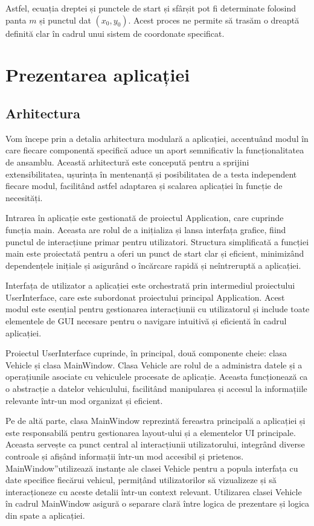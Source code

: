\documentclass[a4paper,12pt]{report}
\begin{document}
Astfel, ecuația dreptei și punctele de start și sfârșit pot fi determinate folosind panta $m$ și punctul dat $(x_0, y_0)$. Acest proces ne permite să trasăm o dreaptă definită clar în cadrul unui sistem de coordonate specificat.

\chapter{Prezentarea aplicației}
\section{Arhitectura}
Vom începe prin a detalia arhitectura modulară a aplicației, accentuând modul în care fiecare componentă specifică aduce un aport semnificativ la funcționalitatea de ansamblu. Această arhitectură este concepută pentru a sprijini extensibilitatea, ușurința în mentenanță și posibilitatea de a testa independent fiecare modul, facilitând astfel adaptarea și scalarea aplicației în funcție de necesități.

Intrarea în aplicație este gestionată de proiectul Application, care cuprinde funcția main. Aceasta are rolul de a inițializa și lansa interfața grafice, fiind punctul de interacțiune primar pentru utilizatori. Structura simplificată a funcției main este proiectată pentru a oferi un punct de start clar și eficient, minimizând dependențele inițiale și asigurând o încărcare rapidă și neîntreruptă a aplicației.

Interfața de utilizator a aplicației este orchestrată prin intermediul proiectului UserInterface, care este subordonat proiectului principal Application. Acest modul este esențial pentru gestionarea interacțiunii cu utilizatorul și include toate elementele de GUI necesare pentru o navigare intuitivă și eficientă în cadrul aplicației.

Proiectul UserInterface cuprinde, în principal, două componente cheie: clasa Vehicle și clasa MainWindow. Clasa Vehicle are rolul de a administra datele și a operațiunile asociate cu vehiculele procesate de aplicație. Aceasta funcționează ca o abstracție a datelor vehiculului, facilitând manipularea și accesul la informațiile relevante într-un mod organizat și eficient.

Pe de altă parte, clasa MainWindow reprezintă fereastra principală a aplicației și este responsabilă pentru gestionarea layout-ului și a elementelor UI principale. Aceasta servește ca punct central al interacțiunii utilizatorului, integrând diverse controale și afișând informații într-un mod accesibil și prietenos. MainWindow”utilizează instanțe ale clasei Vehicle pentru a popula interfața cu date specifice fiecărui vehicul, permițând utilizatorilor să vizualizeze și să interacționeze cu aceste detalii într-un context relevant. Utilizarea clasei Vehicle în cadrul MainWindow asigură o separare clară între logica de prezentare și logica din spate a aplicației.
\end{document}
